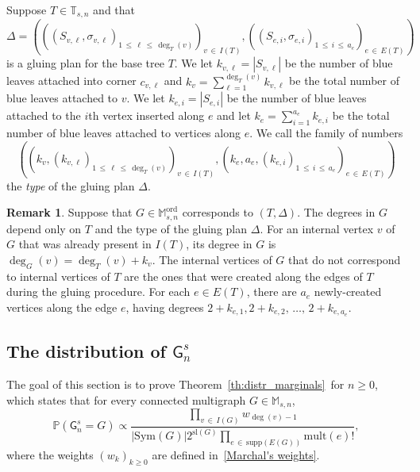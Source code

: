 \documentclass[10pt]{amsart}
\theoremstyle{definition}\newtheorem{defi}[theo]{Definition}\newtheorem{rema}[theo]{Remark}\newtheorem{exam}[theo]{Example}\newtheorem{exem}[theo]{Example}\newtheorem{nota}[theo]{Notation}
\newcommand{\abs}[1]{\left\lvert#1\right\rvert}
\newcommand{\Pp}[1]{\mathbb{P} \left(#1\right)}
\newcommand{\supp}{\mathrm{supp}}
\newcommand{\ord}{\mathrm{ord}}
\newcommand{\sll}{\mathrm{sl}}
\newcommand{\Sym}{\mathrm{Sym}}
\newcommand{\mult}{\mathrm{mult}}
\newcommand{\sG}{\mathsf{G}}
\newcommand{\A}{\mathbb{T}}
\newcommand{\M}{\mathbb{M}}
\begin{document}
Suppose $T \in \A_{s,n}$ and that
\[
\Delta=\left(\left(\left(S_{v,\ell}, \sigma_{v,\ell}\right)_{1\,\le\,\ell\,\le\,\deg_T(v)} \right)_{v\,\in\,I(T)}, \left(\left(S_{e,i},\sigma_{e,i}\right)_{1\,\le\,i\,\le\,a_e} \right)_{e\,\in\,E(T)} \right)
\]
is a gluing plan for the base tree $T$. We let $k_{v,\ell} = |S_{v,\ell}|$ be the number of blue leaves attached into corner $c_{v,\ell}$ and $k_v = \sum_{\ell=1}^{\deg_T(v)} k_{v,\ell}$ be the total number of blue leaves attached to $v$. We let $k_{e,i} = |S_{e,i}|$ be the number of blue leaves attached to the $i$th vertex inserted along $e$ and let $k_e = \sum_{i=1}^{a_e} k_{e,i}$ be the total number of blue leaves attached to vertices along $e$. We call the family of numbers
\[
\left(\left(k_v,\left(k_{v,\ell}\right)_{1\,\leq\,\ell\,\leq\,\deg_T(v)}\right)_{v\,\in\,I(T)}, \left(k_e,a_e,\left(k_{e,i}\right)_{1\,\leq\,i\,\leq \,a_e}\right)_{e\,\in\,E(T)} \right)
\]
the \emph{type} of the gluing plan $\Delta$.


\begin{rema}
Suppose that $G \in \M_{s,n}^{\ord}$ corresponds to $(T,\Delta)$. The degrees in $G$ depend only on $T$ and the type of the gluing plan $\Delta$. For an internal vertex $v$ of $G$ that was already present in $I(T)$, its degree in $G$ is $\deg_G(v)=\deg_T(v)+k_v$. The internal vertices of $G$ that do not correspond to internal vertices of $T$ are the ones that were created along the edges of $T$ during the gluing procedure. For each $e\in E(T)$, there are $a_e$ newly-created vertices along the edge $e$, having degrees $2+k_{e,1}, 2+k_{e,2},\, \dots,\, 2+k_{e,a_e}$.
\end{rema}


\subsection{The distribution of \texorpdfstring{$\sG^s_{n}$}{sGsn}}\label{sec:calculations}

The goal of this section is to prove Theorem~\ref{th:distr_marginals}~for $n\geq 0$, which states that for every connected multigraph $G\in \M_{s,n}$,
\[
\Pp{\sG_{n}^s=G}\propto\frac{\prod\limits_{v\,\in\, I(G)} w_{\deg(v)-1}}{\abs{\Sym(G)}2^{\sll(G)}\prod\limits_{e\,\in\,\supp(E(G))}\mult(e)!},
\]
where the weights $(w_k)_{k\geq 0}$ are defined in~\eqref{Marchal's weights}.
\end{document}
